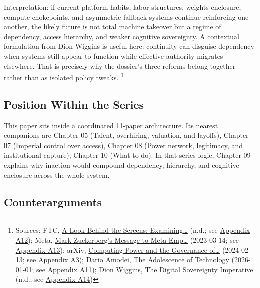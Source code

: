 \documentclass[
  american,
  11pt,
  letterpaper,
]{article}
\begin{document}
Interpretation: if current platform habits, labor structures, weights
enclosure, compute chokepoints, and asymmetric fallback systems continue
reinforcing one another, the likely future is not total machine takeover
but a regime of dependency, access hierarchy, and weaker cognitive
sovereignty. A contextual formulation from Dion Wiggins is useful here:
continuity can disguise dependency when systems still appear to function
while effective authority migrates elsewhere. That is precisely why the
dossier's three reforms belong together rather than as isolated policy
tweaks. \footnote{Sources: FTC,
  \href{https://www.ftc.gov/reports/look-behind-screens-examining-data-practices-social-media-video-streaming-services}{A
  Look Behind the Screens: Examining\ldots{}} (n.d.; see
  \hyperref[ch-09-appendix-a12-a-look-behind-the-screens-examining-the-data-practices-of-social-media-and-video-streaming-services]{Appendix
  A12}); Meta,
  \href{https://about.fb.com/news/2023/03/mark-zuckerberg-meta-year-of-efficiency/}{Mark
  Zuckerberg's Message to Meta Emp\ldots{}} (2023-03-14; see
  \hyperref[ch-09-appendix-a13-mark-zuckerberg-s-message-to-meta-employees]{Appendix
  A13}); arXiv, \href{https://arxiv.org/abs/2402.08797}{Computing Power
  and the Governance of\ldots{}} (2024-02-13; see
  \hyperref[ch-09-appendix-a3-computing-power-and-the-governance-of-artificial-intelligence]{Appendix
  A3}); Dario Amodei,
  \href{https://darioamodei.com/essay/the-adolescence-of-technology}{The
  Adolescence of Technology} (2026-01-01; see
  \hyperref[ch-09-appendix-a11-the-adolescence-of-technology]{Appendix
  A11}); Dion Wiggins,
  \href{https://digitalsovereigntyimperative.com/}{The Digital
  Sovereignty Imperative} (n.d.; see
  \hyperref[ch-09-appendix-a14-the-digital-sovereignty-imperative]{Appendix
  A14})}

\subsection{Position Within the
Series}\label{position-within-the-series-9}

This paper sits inside a coordinated 11-paper architecture. Its nearest
companions are Chapter 05 (Talent, overhiring, valuation, and layoffs),
Chapter 07 (Imperial control over access), Chapter 08 (Power network,
legitimacy, and institutional capture), Chapter 10 (What to do). In that
series logic, Chapter 09 explains why inaction would compound
dependency, hierarchy, and cognitive enclosure across the whole system.

\subsection{Counterarguments}\label{counterarguments-9}
\end{document}
